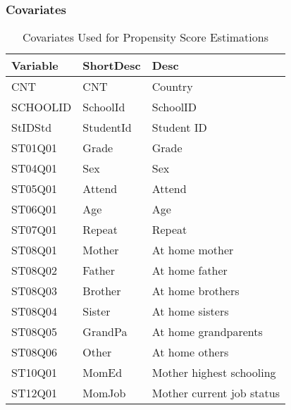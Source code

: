 \documentclass[10pt,slidestop,mathserif]{beamer}
\begin{document}
\begin{frame}
	\frametitle{Covariates}
\begin{table}[ht]
\begin{center}
\begin{tabular}{lll}
  \hline
Variable & ShortDesc & Desc \\ 
  \hline
CNT & CNT & Country \\ 
  SCHOOLID & SchoolId & SchoolID \\ 
  StIDStd & StudentId & Student ID \\ 
  ST01Q01 & Grade & Grade \\ 
  ST04Q01 & Sex & Sex \\ 
  ST05Q01 & Attend & Attend \\ 
  ST06Q01 & Age & Age \\ 
  ST07Q01 & Repeat & Repeat \\ 
  ST08Q01 & Mother & At home mother \\ 
  ST08Q02 & Father & At home father \\ 
  ST08Q03 & Brother & At home brothers \\ 
  ST08Q04 & Sister & At home sisters \\ 
  ST08Q05 & GrandPa & At home grandparents \\ 
  ST08Q06 & Other & At home others \\ 
  ST10Q01 & MomEd & Mother highest schooling \\ 
  ST12Q01 & MomJob & Mother current job status \\ 
   \hline
\end{tabular}
\caption{Covariates Used for Propensity Score Estimations}
\end{center}
\end{table}
\end{frame}
\end{document}
